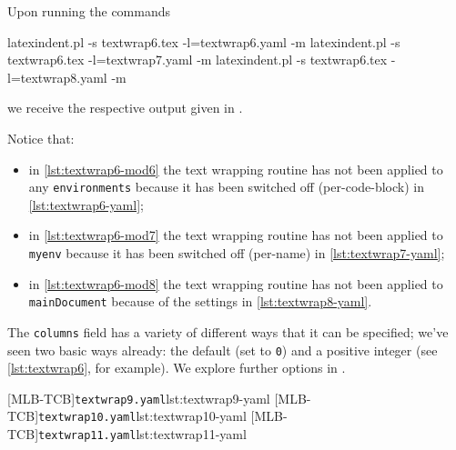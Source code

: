 	Upon running the commands
	\begin{commandshell}
latexindent.pl -s textwrap6.tex -l=textwrap6.yaml -m
latexindent.pl -s textwrap6.tex -l=textwrap7.yaml -m
latexindent.pl -s textwrap6.tex -l=textwrap8.yaml -m
\end{commandshell}
	we receive the respective output given in
	.
	\begin{widepage}


	\end{widepage}

	Notice that:
	\begin{itemize}
		\item in \cref{lst:textwrap6-mod6} the text wrapping routine has not been applied to any
		      \texttt{environments} because it has been switched off (per-code-block) in
		      \cref{lst:textwrap6-yaml};
		\item in \cref{lst:textwrap6-mod7} the text wrapping routine has not been applied to
		      \texttt{myenv} because it has been switched off (per-name) in \cref{lst:textwrap7-yaml};
		\item in \cref{lst:textwrap6-mod8} the text wrapping routine has not been applied to
		      \texttt{mainDocument} because of the settings in \cref{lst:textwrap8-yaml}.
	\end{itemize}

	The \texttt{columns} field has a variety of different ways that it can be specified;
	we've seen two basic ways already: the default (set to \texttt{0}) and a positive integer
	(see \vref{lst:textwrap6}, for example). We explore further options in
	.

	\begin{cmhtcbraster}[raster columns=3,
			raster left skip=-3.5cm,
			raster right skip=-2cm,
			raster column skip=.03\linewidth]
		[MLB-TCB]{\texttt{textwrap9.yaml}}{lst:textwrap9-yaml}
		[MLB-TCB]{\texttt{textwrap10.yaml}}{lst:textwrap10-yaml}
		[MLB-TCB]{\texttt{textwrap11.yaml}}{lst:textwrap11-yaml}
	\end{cmhtcbraster}

